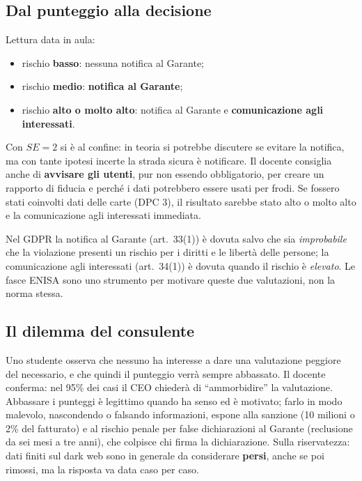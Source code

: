 \subsection{Dal punteggio alla decisione}
Lettura data in aula:
\begin{itemize}
  \item rischio \textbf{basso}: nessuna notifica al Garante;
  \item rischio \textbf{medio}: \textbf{notifica al Garante};
  \item rischio \textbf{alto o molto alto}: notifica al Garante e \textbf{comunicazione agli
    interessati}.
\end{itemize}
Con $SE = 2$ si è al confine: in teoria si potrebbe discutere se evitare la notifica, ma con tante
ipotesi incerte la strada sicura è notificare. Il docente consiglia anche di \textbf{avvisare gli
utenti}, pur non essendo obbligatorio, per creare un rapporto di fiducia e perché i dati potrebbero
essere usati per frodi. Se fossero stati coinvolti dati delle carte (DPC 3), il risultato sarebbe stato
alto o molto alto e la comunicazione agli interessati immediata.

\begin{integrazione}
Nel GDPR la notifica al Garante (art.~33(1)) è dovuta salvo che sia \emph{improbabile} che la violazione
presenti un rischio per i diritti e le libertà delle persone; la comunicazione agli interessati
(art.~34(1)) è dovuta quando il rischio è \emph{elevato}. Le fasce ENISA sono uno strumento per
motivare queste due valutazioni, non la norma stessa.
\end{integrazione}

\subsection{Il dilemma del consulente}
Uno studente osserva che nessuno ha interesse a dare una valutazione peggiore del necessario, e che
quindi il punteggio verrà sempre abbassato. Il docente conferma: nel 95\% dei casi il CEO chiederà di
``ammorbidire'' la valutazione. Abbassare i punteggi è legittimo quando ha senso ed è motivato; farlo in
modo malevolo, nascondendo o falsando informazioni, espone alla sanzione (10 milioni o 2\% del
fatturato) e al rischio penale per false dichiarazioni al Garante (reclusione da sei mesi a tre anni),
che colpisce chi firma la dichiarazione. Sulla riservatezza: dati finiti sul dark web sono in generale
da considerare \textbf{persi}, anche se poi rimossi, ma la risposta va data caso per caso.

